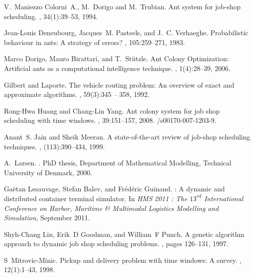 \documentclass[review]{elsarticle}
\begin{document}
\begin{thebibliography}{10}
V.~Maniezzo Colorni~A., M.~Dorigo and M.~Trubian.
\newblock Ant system for job-shop scheduling.
, 34(1):39--53, 1994.

Jean-Louis Deneubourg, Jacques~M. Pasteels, and J.~C. Verhaeghe.
\newblock Probabilistic behaviour in ants: A strategy of errors?
, 105:259--271, 1983.

Marco Dorigo, Mauro Birattari, and T.~Stützle.
\newblock Ant {C}olony {O}ptimization: {A}rtificial ants as a computational
  intelligence technique.
, 1(4):28--39, 2006.

Gilbert and Laporte.
\newblock The vehicle routing problem: An overview of exact and approximate
  algorithms.
, 59(3):345 -- 358,
  1992.

Rong-Hwa Huang and Chang-Lin Yang.
\newblock Ant colony system for job shop scheduling with time windows.
,
  39:151--157, 2008.
/s00170-007-1203-9.

Anant~S. Jain and Sheik Meeran.
\newblock A state-of-the-art review of job-shop scheduling techniques.
, (113):390--434, 1999.

A.~Larsen.
.
\newblock PhD thesis, Department of Mathematical Modelling, Technical
  University of Denmark, 2000.

Ga{\"e}tan Lesauvage, Stefan Balev, and Fr{\'e}d{\'e}ric Guinand.
 : A dynamic and distributed container terminal
  simulator.
\newblock In {\em HMS 2011 : The $13^{rd}$ International Conference on Harbor,
  Maritime {\&} Multimodal Logistics Modelling and Simulation}, September 2011.

Shyh-Chang Lin, Erik~D Goodman, and William~F Punch.
\newblock A genetic algorithm approach to dynamic job shop scheduling problems.
, pages 126--131, 1997.

S~Mitrovic-Minic.
\newblock Pickup and delivery problem with time windows: A survey.
, 12(1):1–43, 1998.


\end{thebibliography}
\end{document}
